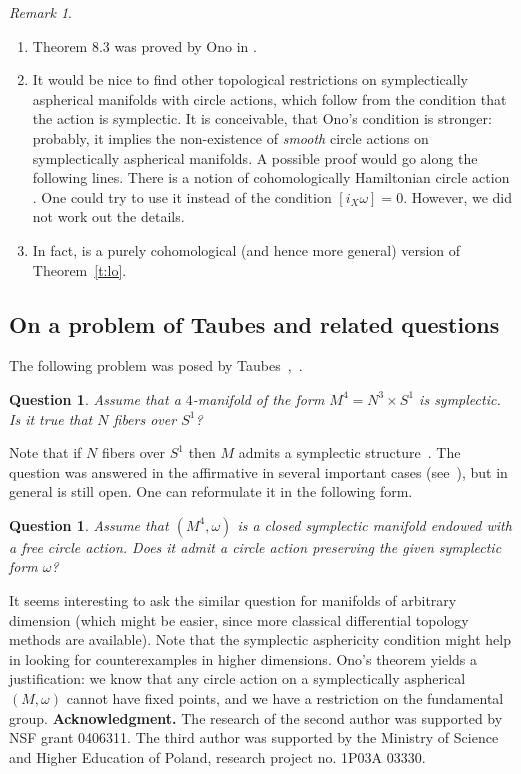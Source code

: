 \documentclass[12pt]{amsart}
\newtheorem{question}[subsection]{Question}
\numberwithin{equation}{section}
\theoremstyle{definition}
\theoremstyle{remark}
\newtheorem{remark}[subsection]{Remark}
\newcommand\theoref{Theorem~\ref}
\numberwithin{figure}{section}
\numberwithin{table}{section}
\begin{document}
\begin{remark} \hfill 
\begin{enumerate}  
\item   
Theorem 8.3 was proved by Ono in \cite{O}. 
\item  
 It would be nice to find other  
topological restrictions on symplectically aspherical manifolds with circle  
actions, which follow from the condition that the action is symplectic. It is 
conceivable, that Ono's condition is stronger: probably, it implies the 
non-existence of {\it smooth} circle actions on symplectically aspherical 
manifolds. A possible proof would go along the following lines. There is a 
notion of cohomologically Hamiltonian circle action \cite{LO}. One could try to 
use it instead of the condition $[i_X\omega]=0$. However, we did not work out 
the details.  
\item 
In fact, \cite[Theorem 4.16]{LO} is a purely cohomological (and hence more 
general) version of \theoref{t:lo}. 
\end{enumerate} 
\end{remark} 
 
\subsection{On a problem of Taubes and related questions} The following problem  
was posed by Taubes~\cite{Ba},~\cite{FV}. 
 
\begin{question} Assume that a $4$-manifold of the form $M^4=N^3\times S^1$ is  
symplectic. Is it true 
that $N$ fibers over $S^1$? 
\end{question} 
 
Note that if $N$ fibers over $S^1$ then $M$ admits a symplectic  
structure~\cite{Ba}. The question was answered in the affirmative in several  
important cases  (see~\cite{FV}), but in general is still open. One can  
reformulate it in the following form. 
 
\begin{question} Assume that $(M^4,\omega)$ is a closed symplectic manifold  
endowed with a free circle action. Does it admit a circle action preserving the  
given symplectic form $\omega$? 
\end{question} 
 
It seems interesting to ask the similar question for manifolds of arbitrary  
dimension (which might be easier, since more classical differential topology  
methods are available). Note that the symplectic asphericity condition might 
help  
in looking for counterexamples in higher dimensions. Ono's theorem yields a  
justification: we know that any circle action on a symplectically aspherical  
$(M,\omega)$  cannot have fixed points, and we have a restriction on the  
fundamental group. 
\vskip6pt  
{\bf Acknowledgment.} The research of the second author was supported by NSF 
grant 0406311. The third author was supported by the Ministry of Science and 
Higher Education of Poland, research project no. 1P03A 03330. 
 
\end{document}
